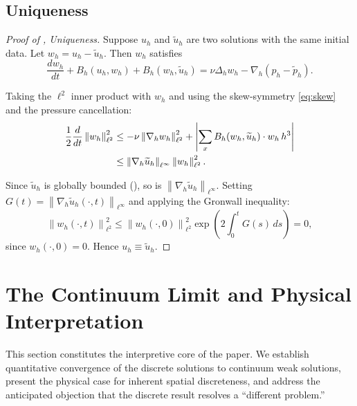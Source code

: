 \documentclass[12pt, a4paper]{article}
\theoremstyle{plain}
\theoremstyle{definition}
\theoremstyle{remark}
\newcommand{\norm}[1]{\left\| #1 \right\|}
\newcommand{\abs}[1]{\left| #1 \right|}
\newcommand{\grad}{\nabla_h}
\newcommand{\lapl}{\Delta_h}
\newcommand{\uh}{u_h}
\begin{document}
\subsection{Uniqueness}

\begin{proof}[Proof of , Uniqueness]
  Suppose $\uh$ and $\widetilde{u}_h$ are two solutions with the same
  initial data. Let $w_h = \uh - \widetilde{u}_h$. Then $w_h$ satisfies
  \begin{equation}
    \frac{dw_h}{dt} + B_h(\uh, w_h) + B_h(w_h, \widetilde{u}_h)
    = \nu\lapl w_h - \grad(p_h - \widetilde{p}_h).
  \end{equation}

  Taking the $\ell^2$ inner product with $w_h$ and using the skew-symmetry
  \eqref{eq:skew} and the pressure cancellation:
  \begin{align}
    \frac{1}{2}\frac{d}{dt}\norm{w_h}_{\ell^2}^2
    &\leq -\nu\norm{\grad w_h}_{\ell^2}^2
      + \abs{\sum_{x} B_h(w_h, \widetilde{u}_h) \cdot w_h \, h^3} \notag \\
    &\leq \norm{\grad\widetilde{u}_h}_{\ell^\infty} \norm{w_h}_{\ell^2}^2.
  \end{align}

  Since $\widetilde{u}_h$ is globally bounded (), so is
  $\norm{\grad\widetilde{u}_h}_{\ell^\infty}$. Setting
  $G(t) = \norm{\grad\widetilde{u}_h(\cdot,t)}_{\ell^\infty}$ and applying
  the Gronwall inequality:
  \begin{equation}
    \norm{w_h(\cdot,t)}_{\ell^2}^2
    \leq \norm{w_h(\cdot,0)}_{\ell^2}^2 \exp\!\left(2\int_0^t G(s)\,ds\right) = 0,
  \end{equation}
  since $w_h(\cdot, 0) = 0$. Hence $\uh \equiv \widetilde{u}_h$.
\end{proof}

\section{The Continuum Limit and Physical Interpretation}\label{sec:continuum}

This section constitutes the interpretive core of the paper. We establish
quantitative convergence of the discrete solutions to continuum weak solutions,
present the physical case for inherent spatial discreteness, and address the
anticipated objection that the discrete result resolves a ``different problem.''
\end{document}
